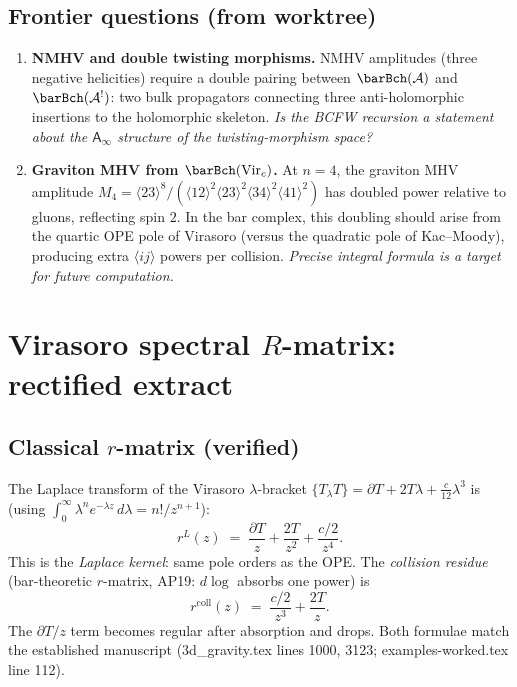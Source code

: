 \documentclass[11pt]{article}
\newcommand{\cA}{\mathcal{A}}
\newcommand{\Ainf}{\mathsf{A}_{\infty}}
\begin{document}
\subsection*{Frontier questions (from worktree)}

\begin{enumerate}[label=(\alph*),nosep]
\item \textbf{NMHV and double twisting morphisms.}
  NMHV amplitudes (three negative helicities) require a double
  pairing between $\barBch(\cA)$ and $\barBch(\cA^!)$: two bulk
  propagators connecting three anti-holomorphic insertions to the
  holomorphic skeleton.  \emph{Is the BCFW recursion a statement
  about the $\Ainf$ structure of the twisting-morphism space?}

\item \textbf{Graviton MHV from $\barBch(\mathrm{Vir}_c)$.}
  At $n = 4$, the graviton MHV amplitude
  $M_4 = \langle 23\rangle^8 /
  (\langle 12\rangle^2 \langle 23\rangle^2
  \langle 34\rangle^2 \langle 41\rangle^2)$
  has doubled power relative to gluons, reflecting spin $2$.  In the
  bar complex, this doubling should arise from the quartic OPE pole
  of Virasoro (versus the quadratic pole of Kac--Moody), producing
  extra $\langle ij\rangle$ powers per collision.  \emph{Precise integral
  formula is a target for future computation.}
\end{enumerate}


\section{Virasoro spectral $R$-matrix: rectified extract}
\label{sec:virasoro-spectral-R-rectified}
%

\subsection*{Classical $r$-matrix (verified)}

The Laplace transform of the Virasoro $\lambda$-bracket
$\{T{}_\lambda T\} = \partial T + 2T\lambda + \frac{c}{12}\lambda^3$
is (using $\int_0^\infty \lambda^n e^{-\lambda z}\,d\lambda = n!/z^{n+1}$):
\begin{equation}\label{eq:vir-rL-rectified}
r^L(z)
\;=\;
\frac{\partial T}{z}
+ \frac{2T}{z^2}
+ \frac{c/2}{z^4}.
\end{equation}
This is the \emph{Laplace kernel}: same pole orders as the OPE.
The \emph{collision residue} (bar-theoretic $r$-matrix, AP19: $d\log$
absorbs one power) is
\begin{equation}\label{eq:vir-rcoll-rectified}
r^{\mathrm{coll}}(z)
\;=\;
\frac{c/2}{z^3} + \frac{2T}{z}.
\end{equation}
The $\partial T/z$ term becomes regular after absorption and drops.
Both formulae match the established manuscript (3d\_gravity.tex
lines 1000, 3123; examples-worked.tex line 112).
\end{document}
